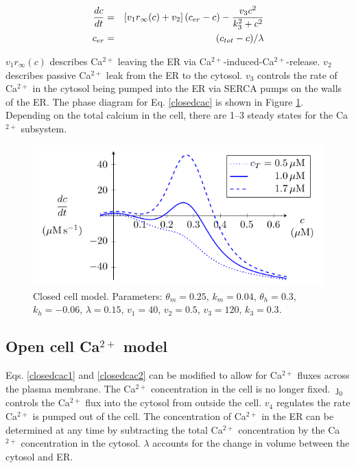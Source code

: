 \documentclass[12pt]{article}
\def\ca{Ca$^{2+}$\xspace}
\def\ctot{c_{tot}}
\def\cer{c_{er}}
\def\rinf{r_\infty}
\def\rinf{r_\infty}
\def\thetam{\theta_m}
\def\km{k_m}
\def\thetah{\theta_h}
\def\kh{k_h}
\begin{document}
\begin{eqnarray}
  \ddt{c} &=&  \left[ v_1  \rinf (c)+ v_2 \right] (\cer - c ) - \frac{v_3 c^2}{k_3^2+c^2} \label{closedcac1}\\
  \cer &=& (\ctot-c)/\lambda \label{closedcac2}
\end{eqnarray}

$v_1r_\infty(c)$ describes \ca leaving the ER via \ca-induced-\ca-release. $v_2$ describes passive \ca leak from the ER to the cytosol. $v_3$ controls the rate of \ca in the cytosol being pumped into the ER via SERCA pumps on the walls of the ER. The phase diagram for Eq. \ref{closedcac} is shown in Figure \ref{CalciumClosedCell}. Depending on the total calcium in the cell, there are 1--3 steady states for the \ca subsystem.

\def\figthetam{0.25}
\def\figkm{0.04}
\def\figthetah{0.3}
\def\figkh{-0.06}
\def\figlambda{0.15}
\def\figvone{40}
\def\figvtwo{0.5}
\def\figvthree{120}
\def\figkthree{0.3}


\begin{figure}[h!]
\centering
\includegraphics[]{Fig03CalciumClosedCellModel.pdf}
\caption{Closed cell model. Parameters: 
$\thetam=\figthetam$,
$\km=\figkm$,
$\thetah=\figthetah$,
$\kh=\figkh$,
$\lambda=\figlambda$,
$v_1 = \figvone$,
$v_2 = \figvtwo$,
$v_3 = \figvthree$, 
$k_3 = \figkthree$.
}
\label{CalciumClosedCell}
\end{figure}
 
\clearpage
\subsection*{Open cell Ca$^{2+}$ model} 

Eqs. \ref{closedcac1} and \ref{closedcac2} can be modified to allow for \ca fluxes across the plasma membrane. The \ca concentration in the cell is no longer fixed. $\jmath_0$ controls the \ca flux into the cytosol from outside the cell. $v_4$ regulates the rate \ca is pumped out of the cell. The concentration of \ca in the ER can be determined at any time by subtracting the total \ca concentration by the \ca concentration in the cytosol. $\lambda$ accounts for the change in volume between the cytosol and ER. 
\end{document}
